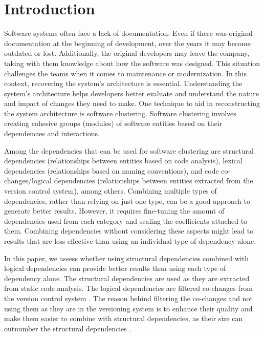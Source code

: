 \documentclass{ieeeaccess}
\begin{document}
\titlepgskip=-21pt

\maketitle

\section{Introduction}
\label{sec:introduction}

Software systems often face a lack of documentation. Even if there was original documentation at the beginning of development, over the years it may become outdated or lost. Additionally, the original developers may leave the company, taking with them knowledge about how the software was designed. This situation challenges the teams when it comes to maintenance or modernization. In this context, recovering the system's architecture is essential. Understanding the system's architecture helps developers better evaluate and understand the nature and impact of changes they need to make. One technique to aid in reconstructing the system architecture is software clustering. Software clustering involves creating cohesive groups (modules) of software entities based on their dependencies and interactions.

Among the dependencies that can be used for software clustering are structural dependencies (relationships between entities based on code analysis), lexical dependencies (relationships based on naming conventions), and code co-changes/logical dependencies (relationships between entities extracted from the version control system), among others. Combining multiple types of dependencies, rather than relying on just one type, can be a good approach to generate better results. However, it requires fine-tuning the amount of dependencies used from each category and scaling the coefficients attached to them. Combining dependencies without considering these aspects might lead to results that are less effective than using an individual type of dependency alone.

In this paper, we assess whether using structural dependencies combined with logical dependencies can provide better results than using each type of dependency alone. The structural dependencies are used as they are extracted from static code analysis. The logical dependencies are filtered co-changes from the version control system \cite{b15}. The reason behind filtering the co-changes and not using them as they are in the versioning system is to enhance their quality and make them easier to combine with structural dependencies, as their size can outnumber the structural dependencies \cite{b1}.
\end{document}
